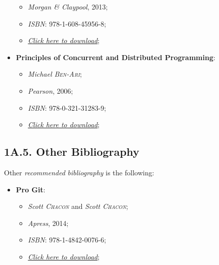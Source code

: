 \begin{itemize}
\begin{itemize}
        \item \emph{Morgan \& Claypool}, 2013;
        \item \emph{ISBN}: 978-1-608-45956-8;
        \item \href{https://github.com/rubenandrebarreiro/fct-nova-concurrency-and-parallelism-labs/raw/main/books/additional-bibliography/shared-memory-synchronization-michael-scott.pdf}{\emph{Click here to download}};
    \end{itemize}
    \newpage
    \item \textbf{Principles of Concurrent and Distributed Programming}:
    \begin{itemize}
        \vspace{-0.2cm}
        \item \emph{Michael \textsc{Ben-Ari}};
        \item \emph{Pearson}, 2006;
        \item \emph{ISBN}: 978-0-321-31283-9;
        \item \href{https://github.com/rubenandrebarreiro/fct-nova-concurrency-and-parallelism-labs/raw/main/books/additional-bibliography/principles-of-concurrent-and-distributed-programming-algorithms-and-models-mordechai-ben-ari.pdf}{\emph{Click here to download}};
    \end{itemize}
\end{itemize}

\subsection*{\large{\textbf{1A.5. Other Bibliography}}}
\label{ssec:lecture-1A5}

\noindent Other \emph{recommended} \emph{bibliography} is the following:

\begin{itemize}
    \item \textbf{Pro Git}:
    \begin{itemize}
        \vspace{-0.2cm}
        \item \emph{Scott \textsc{Chacon}} and \emph{Scott \textsc{Chacon}};
        \item \emph{Apress}, 2014;
        \item \emph{ISBN}: 978-1-4842-0076-6;
        \item \href{https://github.com/rubenandrebarreiro/fct-nova-concurrency-and-parallelism-labs/raw/main/books/others/pro-git-scott-chacon-and-ben-straub.pdf}{\emph{Click here to download}};
    \end{itemize}
\end{itemize}

